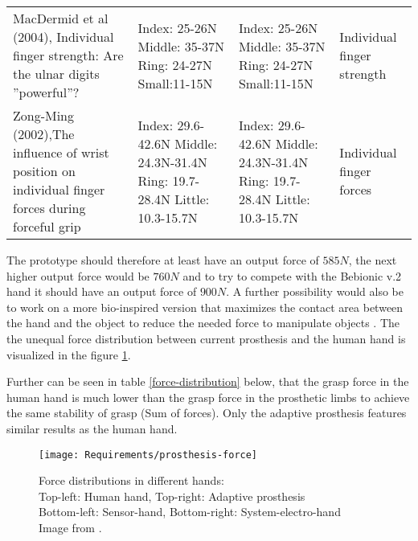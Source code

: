 \documentclass[main]{subfiles}
\begin{document}
\begin{longtable}{p{5.2cm}|p{4.2cm}|p{3.7cm}|p{1.7cm}}
MacDermid et al (2004), Individual finger strength: Are the ulnar digits ''powerful''? \cite{MaxDermid2004} & Index: 25-26N \newline Middle: 35-37N \newline Ring: 24-27N \newline Small:11-15N & Index: 25-26N \newline Middle: 35-37N \newline Ring: 24-27N \newline Small:11-15N & Individual finger strength\\

Zong-Ming (2002),The influence of wrist position on individual finger forces during forceful grip \cite{Zong2002} & Index: 29.6-42.6N \newline Middle: 24.3N-31.4N \newline Ring: 19.7-28.4N \newline Little: 10.3-15.7N & Index: 29.6-42.6N \newline Middle: 24.3N-31.4N \newline Ring: 19.7-28.4N \newline Little: 10.3-15.7N & Individual finger forces\\
\bottomrule
\end{longtable}
\normalsize

\pagebreak
The prototype should therefore at least have an output force of $585 N$, the next higher output force would be $760 N$ and to try to compete with the Bebionic v.2 hand it should have an output force of $900 N$. A further possibility would also be to work on a more bio-inspired version that maximizes the contact area between the hand and the object to reduce the needed force to manipulate objects \cite{Kargov2004}. The the unequal force distribution between current prosthesis and the human hand is visualized in the figure \ref{force-requirement}.

Further can be seen in table \ref{force-distribution} below, that the grasp force in the human hand is much lower than the grasp force in the prosthetic limbs to achieve the same stability of grasp (Sum of forces). Only the adaptive prosthesis features similar results as the human hand.

\begin{figure}[H]
\centering
\texttt{[image: Requirements/prosthesis-force]}
\caption[Force distributions in different hands]{Force distributions in different hands:\\
Top-left: Human hand,
Top-right: Adaptive prosthesis\\
Bottom-left: Sensor-hand,
Bottom-right: System-electro-hand\\
Image from \cite{Kargov2004}.}
\label{force-requirement}
\end{figure}
\end{document}
